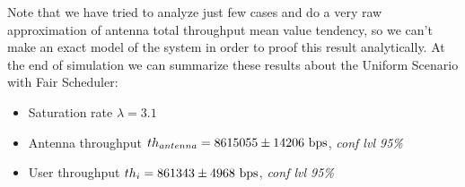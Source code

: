 

Note that we have tried to analyze just few cases and do a very raw approximation of antenna total throughput mean value tendency, so we can't make an exact model of the system in order to proof this result analytically. 
At the end of simulation we can summarize these results about the Uniform Scenario with Fair Scheduler:
\begin{itemize}
	\item Saturation rate \(\lambda = 3.1\)
	\item Antenna throughput \(th_{antenna} = 8615055 \pm 14206 \textnormal{ bps}\), \textit{conf lvl 95\%}
	\item User throughput \(th_{i} = 861343 \pm 4968 \textnormal{ bps}\), \textit{conf lvl 95\%}
\end{itemize} 


